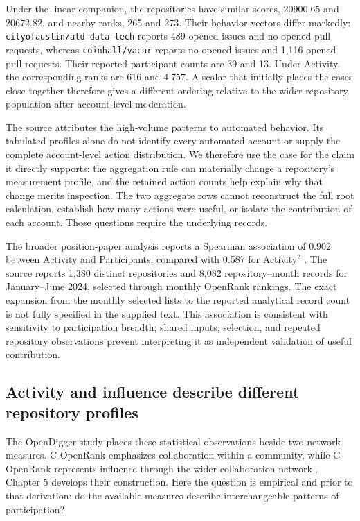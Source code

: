 

Under the linear companion, the repositories have similar scores, 20900.65 and 20672.82, and nearby ranks, 265 and 273. Their behavior vectors differ markedly: \texttt{cityofaustin/atd-data-tech} reports 489 opened issues and no opened pull requests, whereas \texttt{coinhall/yacar} reports no opened issues and 1,116 opened pull requests. Their reported participant counts are 39 and 13. Under Activity, the corresponding ranks are 616 and 4,757. A scalar that initially places the cases close together therefore gives a different ordering relative to the wider repository population after account-level moderation.

The source attributes the high-volume patterns to automated behavior. Its tabulated profiles alone do not identify every automated account or supply the complete account-level action distribution. We therefore use the case for the claim it directly supports: the aggregation rule can materially change a repository's measurement profile, and the retained action counts help explain why that change merits inspection. The two aggregate rows cannot reconstruct the full root calculation, establish how many actions were useful, or isolate the contribution of each account. Those questions require the underlying records.

The broader position-paper analysis reports a Spearman association of 0.902 between Activity and Participants, compared with 0.587 for Activity\(^{2}\) \citep[Table 2]{han2024ose}. The source reports 1,380 distinct repositories and 8,082 repository--month records for January--June 2024, selected through monthly OpenRank rankings. The exact expansion from the monthly selected lists to the reported analytical record count is not fully specified in the supplied text. This association is consistent with sensitivity to participation breadth; shared inputs, selection, and repeated repository observations prevent interpreting it as independent validation of useful contribution.

\subsection{Activity and influence describe different repository profiles}
The OpenDigger study places these statistical observations beside two network measures. C-OpenRank emphasizes collaboration within a community, while G-OpenRank represents influence through the wider collaboration network \citep{wang2026digger}. Chapter 5 develops their construction. Here the question is empirical and prior to that derivation: do the available measures describe interchangeable patterns of participation?

